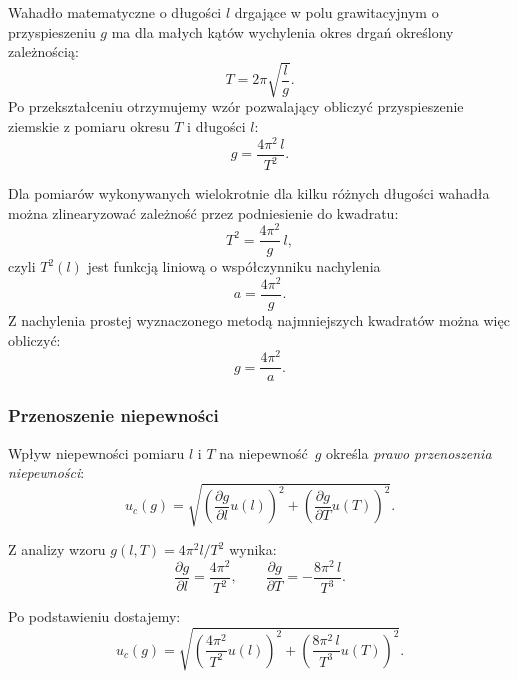 \documentclass{fizykalab}
\begin{document}
Wahadło matematyczne o długości \( l \) drgające w polu grawitacyjnym
o przyspieszeniu \( g \) ma dla małych kątów wychylenia okres drgań
określony zależnością:
\begin{equation}
  T = 2\pi \sqrt{\frac{l}{g}}.
\end{equation}
Po przekształceniu otrzymujemy wzór pozwalający obliczyć
przyspieszenie ziemskie z pomiaru okresu \( T \) i długości \( l \):
\begin{equation}
  g = \frac{4\pi^2\,l}{T^2}.
\end{equation}

Dla pomiarów wykonywanych wielokrotnie dla kilku różnych długości
wahadła można zlinearyzować zależność przez podniesienie do kwadratu:
\begin{equation}
  T^2 = \frac{4\pi^2}{g}\,l,
\end{equation}
czyli \( T^2(l) \) jest funkcją liniową o współczynniku nachylenia
\begin{equation}
  a = \frac{4\pi^2}{g}.
\end{equation}
Z nachylenia prostej wyznaczonego metodą najmniejszych kwadratów można
więc obliczyć:
\begin{equation}
  g = \frac{4\pi^2}{a}.
\end{equation}

\subsubsection*{Przenoszenie niepewności}

Wpływ niepewności pomiaru \( l \) i \( T \) na niepewność \(\,g\)
określa \emph{prawo przenoszenia niepewności}:
\begin{equation}
  u_c(g) =
  \sqrt{
    \left(\frac{\partial g}{\partial l}u(l)\right)^2 +
    \left(\frac{\partial g}{\partial T}u(T)\right)^2
  }.
\end{equation}

\vspace{1em} \noindent
Z analizy wzoru \( g(l,T) = 4\pi^2l/T^2 \) wynika:
\begin{equation}
  \frac{\partial g}{\partial l} = \frac{4\pi^2}{T^2},
  \qquad
  \frac{\partial g}{\partial T} = -\frac{8\pi^2\,l}{T^3}.
\end{equation}

\vspace{1em} \noindent
Po podstawieniu dostajemy:
\begin{equation}
  u_c(g) = \sqrt{
    \left(\frac{4\pi^2}{T^2}u(l)\right)^2 +
  \left(\frac{8\pi^2\,l}{T^3}u(T)\right)^2 }.
\end{equation}
\end{document}

